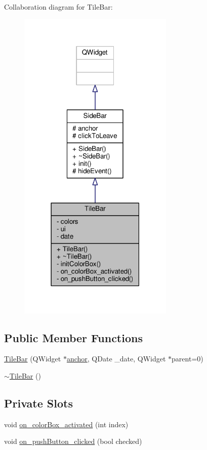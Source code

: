 Collaboration diagram for Tile\+Bar\+:
\nopagebreak
\begin{figure}[H]
\begin{center}
\leavevmode
\includegraphics[width=210pt]{classTileBar__coll__graph}
\end{center}
\end{figure}
\subsection*{Public Member Functions}
\begin{DoxyCompactItemize}
\item 
\hyperlink{classTileBar_a4bbcd770768cb9a6b9635a9fa9392c9d}{Tile\+Bar} (Q\+Widget $\ast$\hyperlink{classSideBar_a0a6a0df257a08bdf785aeb155870efbc}{anchor}, Q\+Date \+\_\+date, Q\+Widget $\ast$parent=0)
\item 
\hyperlink{classTileBar_a435ad278c596c263b3b4e8e8b7bcea9d}{$\sim$\+Tile\+Bar} ()
\end{DoxyCompactItemize}
\subsection*{Private Slots}
\begin{DoxyCompactItemize}
\item 
void \hyperlink{classTileBar_a5c8d5cbdb4610d3d789317e55b048518}{on\+\_\+color\+Box\+\_\+activated} (int index)
\item 
void \hyperlink{classTileBar_af52d88e5b064071a70cda73e2539e64d}{on\+\_\+push\+Button\+\_\+clicked} (bool checked)
\end{DoxyCompactItemize}

